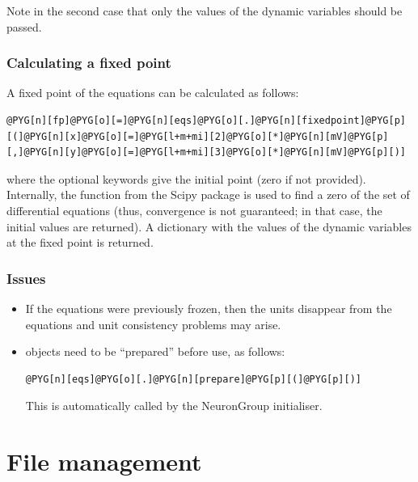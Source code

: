 \documentclass[letterpaper,10pt,english]{manual}
\begin{document}
Note in the second case that only the values of the dynamic variables should be passed.

\subsubsection{Calculating a fixed point}

A fixed point of the equations can be calculated as follows:

\begin{Verbatim}[commandchars=@\[\]]
@PYG[n][fp]@PYG[o][=]@PYG[n][eqs]@PYG[o][.]@PYG[n][fixedpoint]@PYG[p][(]@PYG[n][x]@PYG[o][=]@PYG[l+m+mi][2]@PYG[o][*]@PYG[n][mV]@PYG[p][,]@PYG[n][y]@PYG[o][=]@PYG[l+m+mi][3]@PYG[o][*]@PYG[n][mV]@PYG[p][)]
\end{Verbatim}

where the optional keywords give the initial point (zero if not provided).
Internally, the function  from the Scipy package is used to
find a zero of the set of differential equations (thus, convergence is not
guaranteed; in that case, the initial values are returned).
A dictionary with the values of the dynamic variables at the fixed point is returned.


\subsubsection{Issues}
\begin{itemize}
\item {} 
If the equations were previously frozen, then the units disappear from the equations
and unit consistency problems may arise.

\item {} 
\hyperlink{brian.Equations}{} objects need to be ``prepared'' before use, as follows:

\begin{Verbatim}[commandchars=@\[\]]
@PYG[n][eqs]@PYG[o][.]@PYG[n][prepare]@PYG[p][(]@PYG[p][)]
\end{Verbatim}

This is automatically called by the NeuronGroup initialiser.

\end{itemize}

\resetcurrentobjects
\hypertarget{--doc-files}{}

\section{File management}
\end{document}
